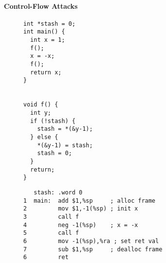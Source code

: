 \documentclass[10pt,conference]{ieeetran}%
\theoremstyle{definition}
\begin{document}
\paragraph*{Control-Flow Attacks}
\begin{figure*}
  \centering
\hspace*{-6em}
  \begin{subfigure}[t]{.2\textwidth}
{\footnotesize
\begin{verbatim}
int *stash = 0;
int main() {
  int x = 1;
  f();
  x = -x;
  f();
  return x;
}


void f() {
  int y;
  if (!stash) {
    stash = *(&y-1);
  } else {
    *(&y-1) = stash;
    stash = 0;
  }
  return;
}
\end{verbatim}
}
\end{subfigure}
  \begin{subfigure}[t]{.4\textwidth}
{\footnotesize
\begin{verbatim}
   stash: .word 0
1  main:  add $1,%sp     ; alloc frame
2         mov $1,-1(%sp) ; init x
3         call f
4         neg -1(%sp)    ; x = -x
5         call f
6         mov -1(%sp),%ra ; set ret val
7         sub $1,%sp     ; dealloc frame
6         ret


\end{verbatim}}
\end{subfigure}
\end{figure*}
\end{document}
